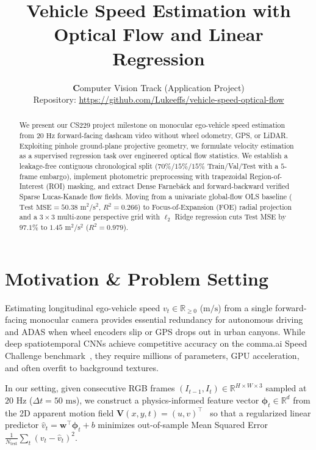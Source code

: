 \documentclass[10pt,twocolumn]{article}
\title{\vspace{-1.3em}\textbf{Vehicle Speed Estimation with Optical Flow and Linear Regression}\vspace{-0.4em}}
\author{
  \textbf Computer Vision Track (Application Project)\\
  Repository: \url{https://github.com/Lukeeffs/vehicle-speed-optical-flow}
}
\date{\vspace{-1.1em}}
\begin{document}
\maketitle

\begin{abstract}
\noindent We present our CS229 project milestone on monocular ego-vehicle speed estimation from $20\text{ Hz}$ forward-facing dashcam video without wheel odometry, GPS, or LiDAR. Exploiting pinhole ground-plane projective geometry, we formulate velocity estimation as a supervised regression task over engineered optical flow statistics. We establish a leakage-free contiguous chronological split ($70\%/15\%/15\%$ Train/Val/Test with a $5$-frame embargo), implement photometric preprocessing with trapezoidal Region-of-Interest (ROI) masking, and extract Dense Farneb\"{a}ck and forward-backward verified Sparse Lucas-Kanade flow fields. Moving from a univariate global-flow OLS baseline ($\text{Test MSE} = 50.38\text{ m}^2/\text{s}^2$, $R^2 = 0.266$) to Focus-of-Expansion (FOE) radial projection and a $3 \times 3$ multi-zone perspective grid with $\ell_2$ Ridge regression cuts Test MSE by $97.1\%$ to $1.45\text{ m}^2/\text{s}^2$ ($R^2 = 0.979$).
\end{abstract}

\section{Motivation \& Problem Setting}
Estimating longitudinal ego-vehicle speed $v_t \in \mathbb{R}_{\ge 0}$ ($\text{m/s}$) from a single forward-facing monocular camera provides essential redundancy for autonomous driving and ADAS when wheel encoders slip or GPS drops out in urban canyons. While deep spatiotemporal CNNs achieve competitive accuracy on the comma.ai Speed Challenge benchmark~\cite{comma2017}, they require millions of parameters, GPU acceleration, and often overfit to background textures.

In our setting, given consecutive RGB frames $(I_{t-1}, I_t) \in \mathbb{R}^{H \times W \times 3}$ sampled at $20\text{ Hz}$ ($\Delta t = 50\text{ ms}$), we construct a physics-informed feature vector $\boldsymbol{\phi}_t \in \mathbb{R}^d$ from the 2D apparent motion field $\mathbf{V}(x,y,t) = (u, v)^\top$~\cite{horn1981,longuet1980} so that a regularized linear predictor $\hat{v}_t = \mathbf{w}^\top \boldsymbol{\phi}_t + b$ minimizes out-of-sample Mean Squared Error $\frac{1}{N_{\text{test}}}\sum_t (v_t - \hat{v}_t)^2$.
\end{document}
